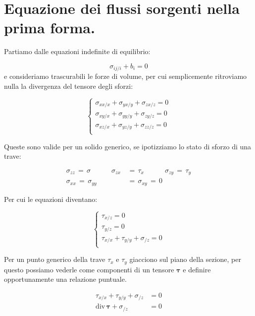 \section{Equazione dei flussi sorgenti nella prima forma.}

Partiamo dalle equazioni indefinite di equilibrio:

\begin{equation*}
    \sigma_{ij/i}    + b_i = 0  
\end{equation*}
e consideriamo trascurabili le forze di volume, per cui semplicemente ritroviamo nulla la divergenza del tensore degli sforzi:

\begin{equation*}
    \begin{cases}
        \sigma_{xx/x}  + \sigma_{yx/y}  + \sigma_{zx/z}   = 0\\
        \sigma_{xy/x}  + \sigma_{yy/y}  + \sigma_{zy/z}   = 0\\
        \sigma_{xz/x}  + \sigma_{yz/y}  + \sigma_{zz/z}  = 0\\
    \end{cases}
\end{equation*}

Queste sono valide per un solido generico, se ipotizziamo lo stato di sforzo di una trave:

\begin{align*}
        \sigma_{zz} \,=\, \sigma \quad\quad\quad \sigma_{zx}\,&=\,\tau_x \quad\quad\quad \sigma_{zy} \,=\,\tau_y\\
         \sigma_{xx}\,=\,\sigma_{yy}\,&=\,\sigma_{xy}\,=\,0
\end{align*}

Per cui le equazioni diventano:

\begin{equation*}
    \begin{cases}
        \tau_{x/z}    = 0\\
        \tau_{y/z} = 0\\
        \tau_{x/x}  + \tau_{y/y}  + \sigma_{/z}  = 0\\
    \end{cases}
\end{equation*}

Per un punto generico della trave $\tau_x$ e $\tau_y$ giacciono sul piano della sezione, per questo possiamo vederle come componenti di un tensore $\boldsymbol{\tau}$ e definire opportunamente una relazione puntuale.

\begin{align*}
     \tau_{x/x}  + \tau_{y/y}  + \sigma_{/z}  &= 0\\
      \mathrm{div}\, \boldsymbol{\tau}  + \sigma_{/z}  &= 0\\
\end{align*}

